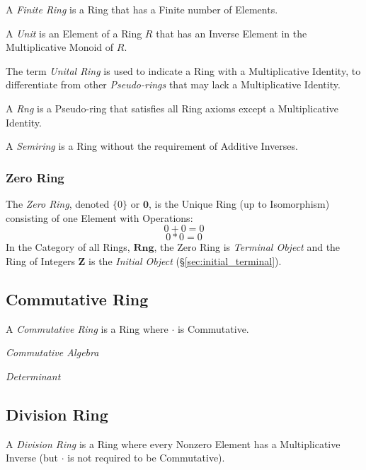 A \emph{Finite Ring} is a Ring that has a Finite number of Elements.

A \emph{Unit} is an Element of a Ring $R$ that has an Inverse
Element in the Multiplicative Monoid of $R$.

The term \emph{Unital Ring} is used to indicate a Ring with a
Multiplicative Identity, to differentiate from other
\emph{Pseudo-rings} that may lack a Multiplicative Identity.

A \emph{Rng} is a Pseudo-ring that satisfies all Ring axioms except a
Multiplicative Identity.

A \emph{Semiring} is a Ring without the requirement of Additive
Inverses.



\subsubsection{Zero Ring}\label{sec:zero_ring}

The \emph{Zero Ring}, denoted $\{0\}$ or $\mathbf{0}$, is the Unique Ring
(up to Isomorphism) consisting of one Element with Operations:
\[
    0 + 0 = 0
\] \[
    0 * 0 = 0
\]
In the Category of all Rings, $\mathbf{Rng}$, the Zero Ring is
\emph{Terminal Object} and the Ring of Integers $\mathbf{Z}$ is the
\emph{Initial Object} (\S\ref{sec:initial_terminal}).



\subsection{Commutative Ring}\label{sec:commutative_ring}

A \emph{Commutative Ring} is a Ring where $\cdot$ is Commutative.

\emph{Commutative Algebra}

\emph{Determinant}



\subsection{Division Ring}\label{sec:division_ring}

A \emph{Division Ring} is a Ring where every Nonzero Element has a
Multiplicative Inverse (but $\cdot$ is not required to be
Commutative).


